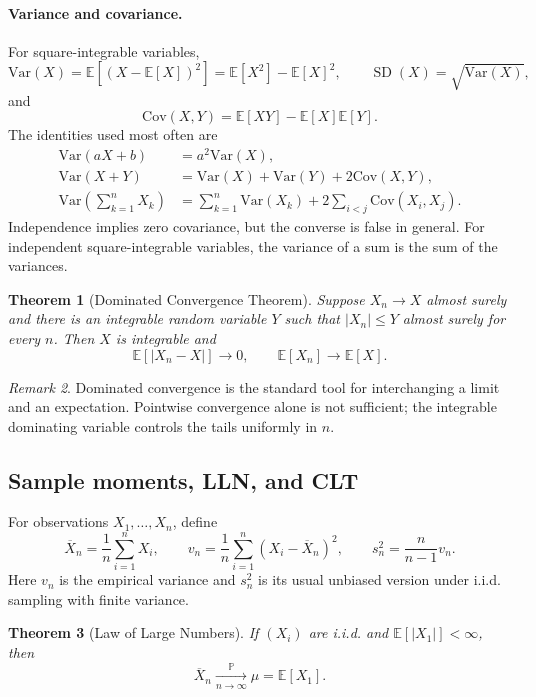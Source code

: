 \documentclass[11pt]{article}
\newcommand{\Pbb}{\mathbb{P}}
\newcommand{\E}{\mathbb{E}}
\newcommand{\Var}{\mathrm{Var}}
\newcommand{\Cov}{\mathrm{Cov}}
\newcommand{\1}{\mathbf{1}}
\theoremstyle{plain}
\newtheorem{theorem}{Theorem}[section]
\theoremstyle{definition}
\theoremstyle{remark}
\newtheorem{remark}[theorem]{Remark}
\begin{document}
\paragraph{Variance and covariance.}
For square-integrable variables,
\[
\Var(X)=\E[(X-\E[X])^2]
=\E[X^2]-\E[X]^2,
\qquad
\operatorname{SD}(X)=\sqrt{\Var(X)},
\]
and
\[
\Cov(X,Y)=\E[XY]-\E[X]\E[Y].
\]
The identities used most often are
\begin{align*}
\Var(aX+b)&=a^2\Var(X),\\
\Var(X+Y)&=\Var(X)+\Var(Y)+2\Cov(X,Y),\\
\Var\!\left(\sum_{k=1}^nX_k\right)
&=\sum_{k=1}^n\Var(X_k)
  +2\sum_{i<j}\Cov(X_i,X_j).
\end{align*}
Independence implies zero covariance, but the converse is false in general.
For independent square-integrable variables, the variance of a sum is the
sum of the variances.

\begin{theorem}[Dominated Convergence Theorem]
Suppose $X_n\to X$ almost surely and there is an integrable random variable
$Y$ such that $|X_n|\le Y$ almost surely for every $n$. Then $X$ is
integrable and
\[
\E[|X_n-X|]\longrightarrow0,
\qquad
\E[X_n]\longrightarrow\E[X].
\]
\end{theorem}

\begin{remark}
Dominated convergence is the standard tool for interchanging a limit and an
expectation. Pointwise convergence alone is not sufficient; the integrable
dominating variable controls the tails uniformly in $n$.
\end{remark}

\subsection{Sample moments, LLN, and CLT}

For observations $X_1,\ldots,X_n$, define
\[
\overline X_n=\frac1n\sum_{i=1}^nX_i,
\qquad
v_n=\frac1n\sum_{i=1}^n(X_i-\overline X_n)^2,
\qquad
s_n^2=\frac{n}{n-1}v_n.
\]
Here $v_n$ is the empirical variance and $s_n^2$ is its usual unbiased
version under i.i.d. sampling with finite variance.

\begin{theorem}[Law of Large Numbers]
If $(X_i)$ are i.i.d. and $\E[|X_1|]<\infty$, then
\[
\overline X_n\xrightarrow[n\to\infty]{\Pbb}\mu=\E[X_1].
\]
\end{theorem}
\end{document}
